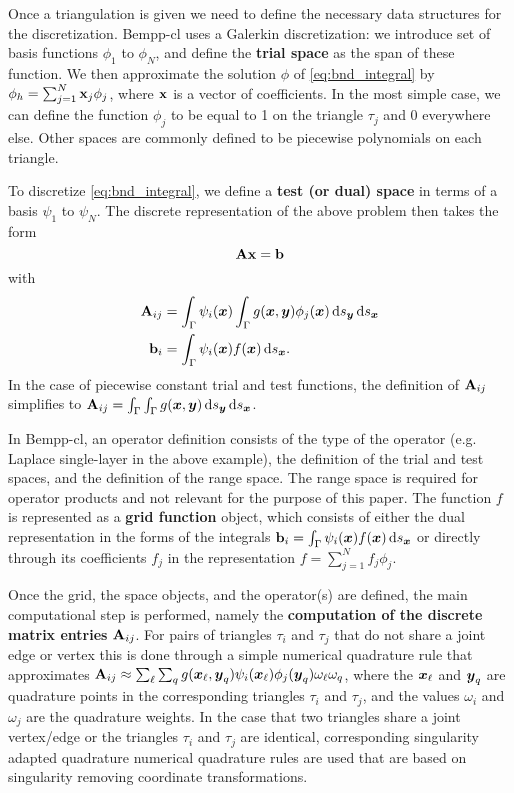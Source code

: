 Once a triangulation is given we need to define the necessary data structures for the discretization. Bempp-cl uses a Galerkin discretization: we introduce set of basis functions \(\phi_1\) to \(\phi_N\), and define the \textbf{trial space} as the span of these function. We then approximate the solution \(\phi\) of \cref{eq:bnd_integral} by $\phi_h=\sum_{j=1}^N \mathbf{x}_j\phi_j$, where $\mathbf{x}$ is a vector of coefficients. In the most simple case, we can define the function \(\phi_j\) to be equal to 1 on the triangle $\tau_j$ and 0 everywhere else. Other spaces are commonly defined to be piecewise polynomials on each triangle.

To discretize \cref{eq:bnd_integral}, we define a \textbf{test (or dual) space} in terms of a basis \(\psi_1\) to \(\psi_N\). The discrete representation of the above problem then takes the form
$$
\mathbf{A}\mathbf{x} = \mathbf{b}
$$
with
\begin{align*}
\dmat{A}_{ij} &= \int_{\Gamma}\psi_i(\bx)\int_{\Gamma}g(\bx, \by)\phi_j(\bx)\ds[\by]\ds[\bx]\\
\dvec{b}_i &= \int_{\Gamma}\psi_i(\bx)f(\bx)\ds[\bx].
\end{align*}
In the case of piecewise constant trial and test functions, the definition of $\mathbf{A}_{ij}$ simplifies to $\dmat{A}_{ij} = \int_{\Gamma}\int_{\Gamma}g(\bx, \by)\ds[\by]\ds[\bx]$.

In Bempp-cl, an operator definition consists of the type of the operator (e.g. Laplace single-layer in the above example),
the definition of the trial and test spaces, and the definition of the range space. The range space is required for operator
products and not relevant for the purpose of this paper. The function $f$ is represented as a \textbf{grid function} object, which
consists of either the dual representation in the forms of the integrals $\dvec{b}_i = \int_{\Gamma}\psi_i(\bx)f(\bx)\ds[\bx]$ or directly through its coefficients $f_j$ in the representation $f=\sum_{j=1}^N f_j\phi_j$.

Once the grid, the space objects, and the operator(s) are defined, the main computational step is performed, namely the \textbf{computation of the discrete matrix entries} $\mathbf{A}_{ij}$. For pairs of triangles $\tau_i$ and $\tau_j$ that do not share a joint edge or vertex this is done through a simple numerical quadrature rule that approximates $\mathbf{A}_{ij}\approx \sum_{\ell}\sum_{q} g(\boldsymbol{x}_\ell, \boldsymbol{y}_q)\psi_i(\boldsymbol{x}_\ell)\phi_j(\boldsymbol{y}_q)\omega_\ell\omega_q$, where the $\boldsymbol{x}_\ell$ and $\boldsymbol{y}_q$ are quadrature points in the corresponding triangles $\tau_i$ and $\tau_j$, and the values $\omega_i$ and $\omega_j$ are the quadrature weights. In the case that two triangles share a joint vertex/edge or the triangles $\tau_i$ and $\tau_j$ are identical, corresponding singularity adapted quadrature numerical quadrature rules are used that are based on singularity removing coordinate transformations.

